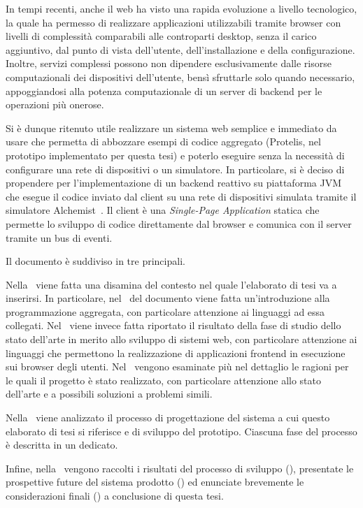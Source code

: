 In tempi recenti, anche il web ha visto una rapida evoluzione a livello tecnologico,
la quale ha permesso di realizzare applicazioni utilizzabili tramite browser con livelli di complessità comparabili alle controparti desktop,
senza il carico aggiuntivo, dal punto di vista dell'utente, dell'installazione e della configurazione.
Inoltre, servizi complessi possono non dipendere esclusivamente dalle risorse computazionali dei dispositivi dell'utente,
bensì sfruttarle solo quando necessario, appoggiandosi alla potenza computazionale di un server di backend per le operazioni più onerose.

Si è dunque ritenuto utile realizzare un sistema web semplice e immediato da usare che permetta di abbozzare esempi di codice aggregato
(Protelis, nel prototipo implementato per questa tesi) e poterlo eseguire senza la necessità di configurare una rete di dispositivi o un simulatore.
In particolare, si è deciso di propendere per l'implementazione di un backend reattivo su piattaforma JVM che esegue il codice inviato dal client su una rete di dispositivi simulata tramite il simulatore Alchemist~\cite{alchemist-jos2013}.
Il client è una \emph{Single-Page Application} statica che permette lo sviluppo di codice direttamente dal browser e comunica con il server tramite un bus di eventi.

\medskip

Il documento è suddiviso in tre  principali.

Nella~ viene fatta una disamina del contesto nel quale l'elaborato di tesi va a inserirsi.
In particolare, nel~ del documento viene fatta un'introduzione alla programmazione aggregata, con particolare attenzione ai linguaggi ad essa collegati.
Nel~ viene invece fatta riportato il risultato della fase di studio dello stato dell'arte in merito allo sviluppo di sistemi web,
con particolare attenzione ai linguaggi che permettono la realizzazione di applicazioni frontend in esecuzione sui browser degli utenti.
Nel~ vengono esaminate più nel dettaglio le ragioni per le quali il progetto è stato realizzato,
con particolare attenzione allo stato dell'arte e a possibili soluzioni a problemi simili.

Nella~ viene analizzato il processo di progettazione del sistema a cui questo elaborato di tesi si riferisce e di sviluppo del prototipo.
Ciascuna fase del processo è descritta in un  dedicato.

Infine, nella~ vengono raccolti i risultati del processo di sviluppo (), presentate le prospettive future del sistema prodotto () ed enunciate brevemente le considerazioni finali () a conclusione di questa tesi.
